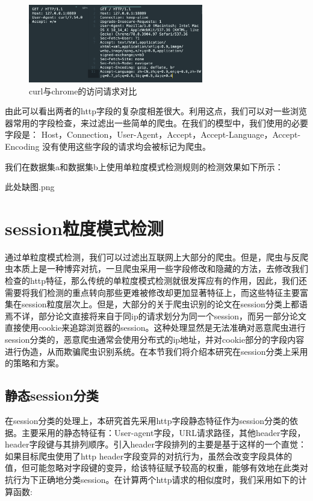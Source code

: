 \documentclass[doctor,privacy,twoside]{buaa_mac}
\begin{document}
\centerline{}
\begin{figure}[!h]
  \centering
  \includegraphics[width=0.68\textwidth]{images/http_request_contrast.png}
  \caption{curl与chrome的访问请求对比}
  \label{fig:logo}
\end{figure}
\centerline{}

由此可以看出两者的http字段的复杂度相差很大。利用这点，我们可以对一些浏览器常用的字段检查，来过滤出一些简单的爬虫。在我们的模型中，我们使用的必要字段是：
Host，Connection，User-Agent，Accept，Accept-Language，Accept-Encoding
没有使用这些字段的请求均会被标记为爬虫。

我们在数据集a和数据集b上使用单粒度模式检测规则的检测效果如下所示：

此处缺图.png


\section{session粒度模式检测}
通过单粒度模式检测，我们可以过滤出互联网上大部分的爬虫。但是，爬虫与反爬虫本质上是一种博弈对抗，一旦爬虫采用一些字段修改和隐藏的方法，去修改我们检查的http特征，那么传统的单粒度模式检测就很发挥应有的作用，因此，我们还需要将我们检测的重点转向那些更难被修改却更加显著特征上，而这些特征主要富集在session粒度层次上。但是，大部分的关于爬虫识别的论文在session分类上都语焉不详，部分论文直接将来自于同ip的请求划分为同一个session，而另一部分论文直接使用cookie来追踪浏览器的session。这种处理显然是无法准确对恶意爬虫进行session分类的，恶意爬虫通常会使用分布式的ip地址，并对cookie部分的字段内容进行伪造，从而欺骗爬虫识别系统。在本节我们将介绍本研究在session分类上采用的策略和方案。

\subsection{静态session分类}
在session分类的处理上，本研究首先采用http字段静态特征作为session分类的依据。主要采用的静态特征有：User-agent字段，URL请求路径，其他header字段，header字段键与其排列顺序。引入header字段排列的主要是基于这样的一个直觉：如果目标爬虫使用了http header字段变异的对抗行为，虽然会改变字段具体的值，但可能忽略对字段键的变异，给该特征赋予较高的权重，能够有效地在此类对抗行为下正确地分类session。在计算两个http请求的相似度时，我们采用如下的计算函数:
\end{document}
